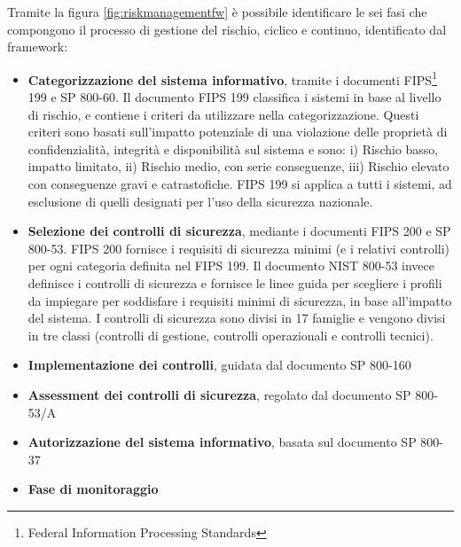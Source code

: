 \documentclass[../main.tex]{subfiles}
\begin{document}
Tramite la figura \ref{fig:riskmanagementfw} è possibile identificare le sei fasi che compongono il processo di gestione del rischio, ciclico e continuo, identificato dal framework:

\begin{itemize}
    \item \textbf{Categorizzazione del sistema informativo}, tramite i documenti FIPS\footnote{Federal Information Processing Standards} 199 e SP 800-60. Il documento FIPS 199 classifica i sistemi in base al livello di rischio, e contiene i criteri da utilizzare nella categorizzazione. Questi criteri sono basati sull'impatto potenziale di una violazione delle proprietà di confidenzialità, integrità e disponibilità sul sistema e sono: i) Rischio basso, impatto limitato, ii) Rischio medio, con serie conseguenze, iii) Rischio elevato con conseguenze gravi e catrastofiche. FIPS 199 si applica a tutti i sistemi, ad esclusione di quelli designati per l'uso della sicurezza nazionale.
    \item \textbf{Selezione dei controlli di sicurezza}, mediante i documenti FIPS 200 e SP 800-53. FIPS 200 fornisce i requisiti di sicurezza minimi (e i relativi controlli) per ogni categoria definita nel FIPS 199.
        Il documento NIST 800-53 invece definisce i controlli di sicurezza e fornisce le linee guida per scegliere i profili da impiegare per soddisfare i requisiti minimi di sicurezza, in base all'impatto del sistema. I controlli di sicurezza sono divisi in 17 famiglie e vengono divisi in tre classi (controlli di gestione, controlli operazionali e controlli tecnici). 
    \item \textbf{Implementazione dei controlli}, guidata dal documento SP 800-160
    \item \textbf{Assessment dei controlli di sicurezza}, regolato dal documento SP 800-53/A
    \item \textbf{Autorizzazione del sistema informativo}, basata sul documento SP 800-37
    \item \textbf{Fase di monitoraggio}        
\end{itemize}
\end{document}
